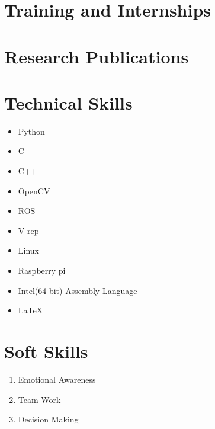 \documentclass[11pt,a4paper,sans]{moderncv} %
\begin{document}
\section{Training and Internships}

\section{Research Publications}

	
\section{Technical Skills}
	
	\begin{itemize}
		\item Python
		\item C
		\item C++
		\item OpenCV
		\item ROS
		\item V-rep
		\item Linux
		\item Raspberry pi
		\item Intel(64 bit) Assembly Language
		\item \LaTeX
		
		
		
	\end{itemize}
	
\section{Soft Skills}
	\begin{enumerate}
		
		\item Emotional Awareness
		\newline{}
		\item Team Work
		\newline{}
		\item Decision Making
		\newline{}
	\end{enumerate}
	
\end{document}
